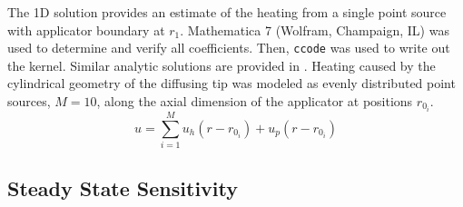 \documentclass{article}         %
\theoremstyle{definition}
\theoremstyle{remark}
\begin{document}
The 1D solution provides an estimate of the heating from a single point source
with applicator boundary at $r_1$. Mathematica 7 (Wolfram, Champaign, IL) was used
to determine and verify all coefficients. Then, \verb#ccode# was used to write out the kernel.
Similar analytic solutions are provided in \cite{Giordano2010,Vyas1992,Deng2002}.
Heating caused by the cylindrical geometry of the diffusing tip was modeled as
evenly distributed point sources, $M = 10$, along the axial dimension of the
applicator at positions $r_{0_i}$. 
\begin{equation}\label{GreenSuperPosition}
  u = \sum_{i=1}^M u_h( r-r_{0_i}) + u_p( r-r_{0_i})
\end{equation}

\subsection{Steady State Sensitivity}
\end{document}
